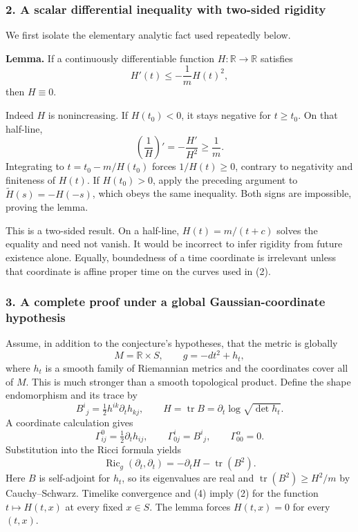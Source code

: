 \documentclass[11pt]{article}
\begin{document}
\subsubsection{2. A scalar differential inequality with two-sided rigidity}
We first isolate the elementary analytic fact used repeatedly below.

\textbf{Lemma.} If a continuously differentiable function $H:\mathbb R\to\mathbb R$ satisfies
\[
 H'(t)\le-\frac1m H(t)^2,                              \tag{2}
\]
then $H\equiv0$.

Indeed $H$ is nonincreasing. If $H(t_0)<0$, it stays negative for $t\ge t_0$. On that half-line,
\[
 \left(\frac1H\right)'=-\frac{H'}{H^2}\ge\frac1m.
\]
Integrating to $t=t_0-m/H(t_0)$ forces $1/H(t)\ge0$, contrary to negativity and finiteness of $H(t)$. If $H(t_0)>0$, apply the preceding argument to $\widetilde H(s)=-H(-s)$, which obeys the same inequality. Both signs are impossible, proving the lemma.

This is a two-sided result. On a half-line, $H(t)=m/(t+c)$ solves the equality and need not vanish. It would be incorrect to infer rigidity from future existence alone. Equally, boundedness of a time coordinate is irrelevant unless that coordinate is affine proper time on the curves used in (2).

\subsubsection{3. A complete proof under a global Gaussian-coordinate hypothesis}
Assume, in addition to the conjecture's hypotheses, that the metric is globally
\[
 M=\mathbb R\times S,\qquad g=-dt^2+h_t,                \tag{3}
\]
where $h_t$ is a smooth family of Riemannian metrics and the coordinates cover all of $M$. This is much stronger than a smooth topological product. Define the shape endomorphism and its trace by
\[
 B^i{}_j=\tfrac12 h^{ik}\partial_t h_{kj},\qquad
 H=\operatorname{tr}B=\partial_t\log\sqrt{\det h_t}.
\]
A coordinate calculation gives
\[
 \Gamma^0_{ij}=\tfrac12\partial_t h_{ij},\qquad
 \Gamma^i_{0j}=B^i{}_j,\qquad \Gamma^\alpha_{00}=0.
\]
Substitution into the Ricci formula yields
\[
 \operatorname{Ric}_g(\partial_t,\partial_t)
 =-\partial_t H-\operatorname{tr}(B^2).                 \tag{4}
\]
Here $B$ is self-adjoint for $h_t$, so its eigenvalues are real and
$\operatorname{tr}(B^2)\ge H^2/m$ by Cauchy--Schwarz. Timelike convergence and (4) imply (2) for the function $t\mapsto H(t,x)$ at every fixed $x\in S$. The lemma forces $H(t,x)=0$ for every $(t,x)$.
\end{document}
